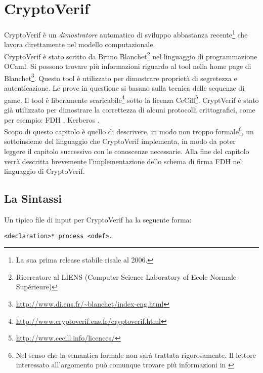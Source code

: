 \documentclass[a4paper,openright,twoside,12pt]{report}
\begin{document}
\chapter{CryptoVerif}
CryptoVerif \`e un \emph{dimostratore} automatico di sviluppo abbastanza recente\footnote{La sua prima release stabile risale al 2006.} che lavora direttamente nel modello computazionale.\\
CryptoVerif \`e stato scritto da Bruno Blanchet\footnote{Ricercatore al LIENS (Computer Science Laboratory of Ecole Normale Supérieure)} nel linguaggio di programmazione OCaml. 
Si possono trovare pi\`u informazioni riguardo al tool nella home page di Blanchet\footnote{\url{http://www.di.ens.fr/~blanchet/index-eng.html}}.
Questo tool \`e utilizzato per dimostrare propriet\`a di segretezza e autenticazione. Le prove in questione  si basano sulla tecnica delle sequenze di game.
Il tool \`e liberamente scaricabile\footnote{\url{http://www.cryptoverif.ens.fr/cryptoverif.html}} sotto la licenza CeCill\footnote{\url{http://www.cecill.info/licences/}}.
CryptVerif \`e stato gi\`a utilizzato per dimostrare la correttezza di alcuni protocolli crittografici, come per esempio: FDH \cite{BlanchetPointchevalCrypto06}, 
Kerberos \cite{BlanchetJaggardScedrovTsayAsiaCCS08}.\\
Scopo di questo capitolo \`e quello di descrivere, in modo non troppo formale\footnote{Nel senso che la semantica formale non sar\`a trattata rigorosamente. Il lettore interessato all'argomento pu\`o comunque trovare pi\`u informazioni in \cite{BlanchetJaggardScedrovTsayAsiaCCS08}}, 
un sottoinsieme del linguaggio che CryptoVerif implementa, in modo 
da poter leggere il capitolo successivo con le conoscenze necessarie.
Alla fine del capitolo verr\`a descritta brevemente l'implementazione dello schema di firma FDH nel linguaggio di CryptoVerif.
\newpage
\section{La Sintassi}
Un tipico file di input per CryptoVerif ha la seguente forma: \begin{verbatim}
<declaration>* process <odef>.
\end{verbatim}
                                                              
\end{document}
